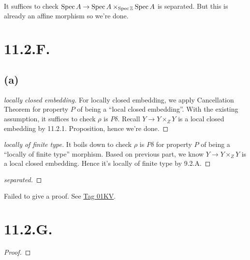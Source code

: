 It suffices to check $\operatorname{Spec} A\to \operatorname{Spec} A\times_{\operatorname{Spec} \mathbb Z} \operatorname{Spec} A$ is separated. But this is already an affine morphism so we're done.

\section{11.2.F.}

\subsection{(a)}

\begin{proof}[locally closed embedding]
    For locally closed embedding, we apply Cancellation Theorem for property $P$ of being a \enquote{local closed embedding}. With the existing assumption, it suffices to check $\rho$ is $P\delta$. Recall $Y\to Y\times_Z Y$ is a local closed embedding by 11.2.1. Proposition, hence we're done.
\end{proof}

\begin{proof}[locally of finite type]
    It boils down to check $\rho$ is $P\delta$ for property $P$ of being a \enquote{locally of finite type} morphism. Based on previous part, we know $Y\to Y\times_Z Y$ is a local closed embedding. Hence it's locally of finite type by 9.2.A.
\end{proof}

\begin{proof}[separated]

\end{proof}
Failed to give a proof. See \href{https://stacks.math.columbia.edu/tag/01KV}{Tag 01KV}. 

\section{11.2.G.}

\begin{proof} 
    
\end{proof}